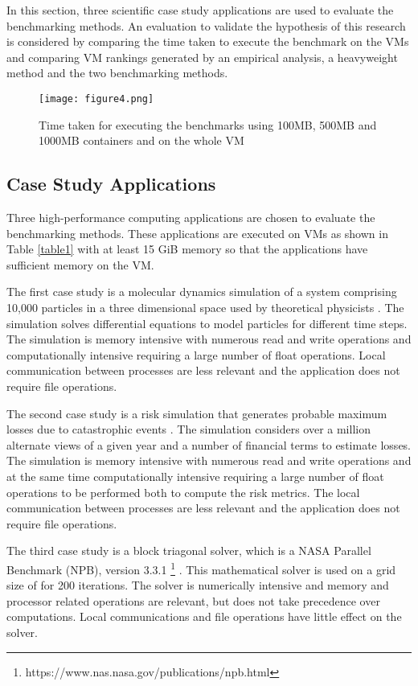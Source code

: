 In this section, three scientific case study applications are used to evaluate the benchmarking methods. An evaluation to validate the hypothesis of this research is considered by comparing the time taken to execute the benchmark on the VMs and comparing VM rankings generated by an empirical analysis, a heavyweight method and the two benchmarking methods. 

\begin{figure*}[ht]
	\centering
	\texttt{[image: figure4.png]}
	\caption{Time taken for executing the benchmarks using 100MB, 500MB and 1000MB containers and on the whole VM}
	\label{evaluation:feasibility}
\end{figure*}

\subsection{Case Study Applications}
\label{studies:casestudy}
Three high-performance computing applications are chosen to evaluate the benchmarking methods. These applications are executed on VMs as shown in Table \ref{table1} with at least 15 GiB memory so that the applications have sufficient memory on the VM. 

The first case study is a molecular dynamics simulation of a system comprising 10,000 particles in a three dimensional space used by theoretical physicists \cite{md-1}. The simulation solves differential equations to model particles for different time steps. The simulation is memory intensive with numerous read and write operations and computationally intensive requiring a large number of float operations. Local communication between processes are less relevant and the application does not require file operations. 

The second case study is a risk simulation that generates probable maximum losses due to catastrophic events \cite{risk-1}. The simulation considers over a million alternate views of a given year and a number of financial terms to estimate losses. The simulation is memory intensive with numerous read and write operations and at the same time computationally intensive requiring a large number of float operations to be performed both to compute the risk metrics. The local communication between processes are less relevant and the application does not require file operations.

The third case study is a block triagonal solver, which is a NASA Parallel Benchmark (NPB), version 3.3.1
\footnote{https://www.nas.nasa.gov/publications/npb.html}
\cite{npb-1}. This mathematical solver is used on a grid size of  for 200 iterations. The solver is numerically intensive and memory and processor related operations are relevant, but does not take precedence over computations. Local communications and file operations have little effect on the solver. 

